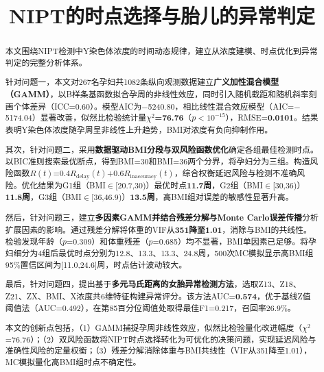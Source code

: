 \documentclass{cumcmthesis}
\title{NIPT的时点选择与胎儿的异常判定}
\begin{document}
\maketitle

\begin{abstract}

本文围绕NIPT检测中Y染色体浓度的时间动态规律，建立从浓度建模、时点优化到异常判定的完整分析体系。

针对问题一，本文对267名孕妇共1082条纵向观测数据建立\textbf{广义加性混合模型（GAMM）}，以B样条基函数拟合孕周的非线性效应，同时引入随机截距和随机斜率刻画个体差异（ICC=0.60）。模型AIC为$-$5240.80，相比线性混合效应模型（AIC=$-$5174.04）显著改善，似然比检验统计量\textbf{$\chi^2$=76.76}（$p<10^{-15}$），RMSE=\textbf{0.0101}。结果表明Y染色体浓度随孕周呈非线性上升趋势，BMI对浓度有负向抑制作用。

其次，针对问题二，采用\textbf{数据驱动BMI分段与双风险函数优化}确定各组最佳检测时点。以BIC准则搜索最优断点，得到BMI=30和BMI=36两个分界，将孕妇分为三组。构造风险函数$R(t)$=0.4$R_{\text{delay}}(t)$+0.6$R_{\text{inaccuracy}}(t)$，综合权衡延迟风险与检测不准确风险。优化结果为G1组（BMI$\in$[20.7,30)）最优时点\textbf{11.7周}，G2组（BMI$\in$[30,36)）\textbf{11.8周}，G3组（BMI$\in$[36,46.9)）\textbf{13.5周}，高BMI组对误差的敏感性显著升高。

然后，针对问题三，建立\textbf{多因素GAMM并结合残差分解与Monte Carlo误差传播}分析扩展因素的影响。通过残差分解将体重的VIF从\textbf{351降至1.01}，消除与BMI的共线性。检验发现年龄（$p$=0.309）和体重残差（$p$=0.685）均不显著，BMI单因素已足够。将孕妇细分为4组后最优时点分别为12.8、13.3、13.3、24.8周，500次MC模拟显示高BMI组95\%置信区间为[11.0,24.6]周，时点估计波动较大。

最后，针对问题四，提出基于\textbf{多元马氏距离的女胎异常检测方法}，选取Z13、Z18、Z21、ZX、BMI、X浓度共6维特征构建异常评分。该方法AUC=\textbf{0.574}，优于基线Z值阈值法（AUC=0.492），在第85百分位阈值处取得最佳F1=0.217，召回率26.9\%。

本文的创新点包括，（1）GAMM捕捉孕周非线性效应，似然比检验量化改进幅度（$\chi^2$=76.76）；（2）双风险函数将NIPT时点选择转化为可优化的决策问题，实现延迟风险与准确性风险的定量权衡；（3）残差分解消除体重与BMI共线性（VIF从351降至1.01），MC模拟量化高BMI组时点不确定性。

\end{abstract}

\end{document}
